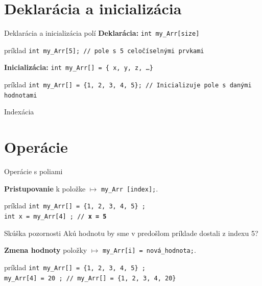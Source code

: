 \documentclass[xcolor=dvipsnames]{beamer}
\begin{document}
\section{Deklarácia a inicializácia}
\begin{frame}{Deklarácia a inicializácia polí}
    \textbf{Deklarácia:} \texttt{int my\_Arr[size]}
    \begin{block}{príklad}
        \texttt{int my\_Arr[5]; // pole s 5 celočíselnými prvkami}
    \end{block}
    
    \textbf{Inicializácia:} \texttt{int my\_Arr[] = \{ x, y, z, \ldots \}}
    \begin{block}{príklad}
        \texttt{int my\_Arr[] = \{1, 2, 3, 4, 5\}; // Inicializuje pole s danými hodnotami}
    \end{block}
    \begin{alertblock}{Indexácia}
    \end{alertblock}
\end{frame}
\section{Operácie}
\begin{frame}{Operácie s poliami}

    \textbf{Pristupovanie} k položke $\longmapsto$ \texttt{my\_Arr [index];}.
    \begin{block}{príklad}
        \texttt{int my\_Arr[] = \{1, 2, 3, 4, 5\} ;\\
        \texttt{int x = my\_Arr[4] ; // \textbf{x = 5}}  
    }
    \end{block}
    \begin{alertblock}{Skúška pozornosti}
        Akú hodnotu by sme v predošlom príklade dostali z indexu 5?
    \end{alertblock}
    \textbf{Zmena hodnoty} položky $\longmapsto$ \texttt{my\_Arr[i] = nová\_hodnota;}.
    \begin{block}{príklad}
        \texttt{int my\_Arr[] = \{1, 2, 3, 4, 5\} ;\\
        \texttt{my\_Arr[4] = 20 ; // \texttt{my\_Arr[] = \{1, 2, 3, 4, {\color{red}20}\}}}  
    }
    \end{block}
\end{frame}
\end{document}
